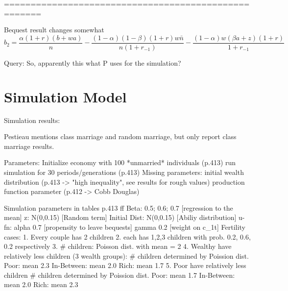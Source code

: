 \documentclass{article}
\begin{document}
=====================================================

Bequest result changes somewhat
\begin{equation}
b_{2} =
\frac{\alpha(1+r)(b+wa)}{n}
- \frac{(1-\alpha)(1-\beta)(1+r)w\bar{n}}{n(1+r_{-1})}
- \frac{(1-\alpha)w(\beta a + z)(1+r)}{1+r_{-1}}
\label{Pestieau11p} \tag{Pestieau 11'}
\end{equation}

Query: So, apparently this what P uses for the simulation?



\section{Simulation Model}

Simulation results:

Pestieau mentions class marriage and random marriage,
but only report class marriage results.

\begin{verbatimtab}
Parameters:
	Initialize economy with 100 *unmarried* individuals (p.413)
	run simulation for 30 periods/generations (p.413)
Missing parameters:
        initial wealth distribution (p.413 -> "high inequality", see results for rough values)
        production function parameter (p.412 -> Cobb Douglas)

Simulation parameters in tables p.413 ff
	Beta:			0.5; 0.6; 0.7	[regression to the mean]
	z: 				N(0,0.15)		[Random term]
	Initial Dist:	N(0,0.15)		[Abiliy distribution]
	u-fn:	alpha	0.7				[propensity to leave bequests]
			gamma	0.2				[weight on c_1t]
	Fertility cases:
		1. Every couple has 2 children
		2. each has 1,2,3 children with prob. 0.2, 0.6, 0.2 respectively
		3. # children: Poisson dist. with mean = 2
		4. Wealthy have relatively less children (3 wealth groups):
			# children determined by Poission dist.
			Poor: 		mean 2.3
			In-Between: mean 2.0
			Rich:		mean 1.7
		5. Poor have relatively less children
			# children determined by Poission dist.
			Poor:		mean 1.7
			In-Between:	mean 2.0
			Rich:		mean 2.3
\end{verbatimtab}
\end{document}
